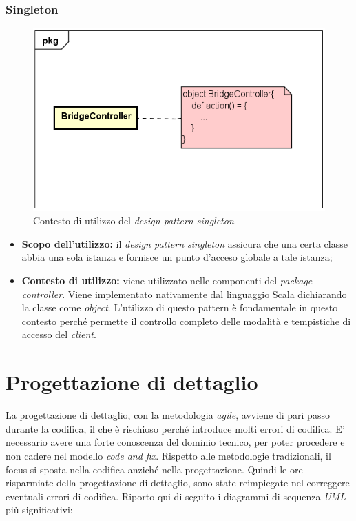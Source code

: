 \subsubsection{Singleton}
\begin{figure}[h]
\centering
\includegraphics[scale=0.55]{immagini/singleton}
\caption{Contesto di utilizzo del \emph{design pattern singleton}}
\label{fig:pattern-singleton}
\end{figure}
\begin{itemize}
\item\textbf{Scopo dell'utilizzo:} il \emph{design pattern singleton} assicura che una certa classe abbia una sola istanza e fornisce un punto d'acceso globale a tale istanza;
\item \textbf{Contesto di utilizzo:} viene utilizzato nelle componenti del \emph{package controller}. Viene implementato nativamente dal linguaggio Scala dichiarando la classe come \emph{object}. L'utilizzo di questo pattern è fondamentale in questo contesto perché permette il controllo completo delle modalità e tempistiche di accesso del \emph{client}.
\end{itemize}



\newpage
\section{Progettazione di dettaglio}
La progettazione di dettaglio, con la metodologia \emph{agile}, avviene di pari passo durante la codifica, il che è rischioso perché introduce molti errori di codifica. E' necessario avere una forte conoscenza del dominio tecnico, per poter procedere e non cadere nel modello \emph{code and fix}. Rispetto alle metodologie tradizionali, il focus si sposta nella codifica anziché nella progettazione. Quindi le ore risparmiate della progettazione di dettaglio, sono state reimpiegate nel correggere eventuali errori di codifica. Riporto qui di seguito i diagrammi di sequenza \emph{UML} più significativi:

